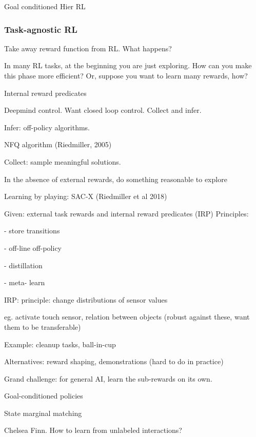 \documentclass[english]{article}
\begin{document}
\item Goal conditioned Hier RL

\eenum 

\subsubsection{Task-agnostic RL}
%
\benum
\item Take away reward function from RL. What happens?

In many RL tasks, at the beginning you are just exploring. How can you make this phase more efficient? Or, suppose you want to learn many rewards, how?


\item Internal reward predicates

Deepmind control. Want closed loop control. Collect and infer. 

Infer: off-policy algorithms. 

NFQ algorithm (Riedmiller, 2005)

Collect: sample meaningful solutions. 

In the absence of external rewards, do something reasonable to explore

Learning by playing: SAC-X (Riedmiller et al 2018)

Given: external task rewards and internal reward predicates (IRP)
Principles:

- store transitions

- off-line off-policy 

- distillation

- meta- learn

IRP: principle: change distributions of sensor values

eg. activate touch sensor, relation between objects (robust against these, want them to be transferable)

Example: cleanup tasks, ball-in-cup

Alternatives: reward shaping, demonstrations (hard to do in practice)

Grand challenge: for general AI, learn the sub-rewards on its own. 

\item Goal-conditioned policies

\item State marginal matching

\item Chelsea Finn. How to learn from unlabeled interactions?
\end{document}
